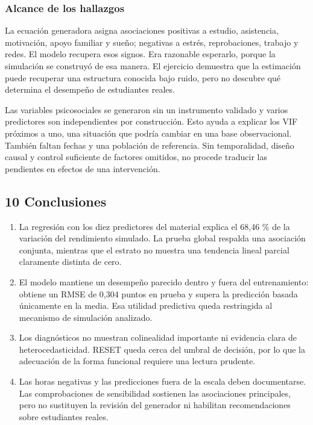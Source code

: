 \documentclass[
  11pt,
  letterpaper,
]{article}
\providecommand{\tightlist}{%
  \setlength{\itemsep}{0pt}\setlength{\parskip}{0pt}}
\begin{document}
\hypertarget{alcance-de-los-hallazgos}{%
\subsubsection{Alcance de los
hallazgos}\label{alcance-de-los-hallazgos}}

La ecuación generadora asigna asociaciones positivas a estudio,
asistencia, motivación, apoyo familiar y sueño; negativas a estrés,
reprobaciones, trabajo y redes. El modelo recupera esos signos. Era
razonable esperarlo, porque la simulación se construyó de esa manera. El
ejercicio demuestra que la estimación puede recuperar una estructura
conocida bajo ruido, pero no descubre qué determina el desempeño de
estudiantes reales.

Las variables psicosociales se generaron sin un instrumento validado y
varios predictores son independientes por construcción. Esto ayuda a
explicar los VIF próximos a uno, una situación que podría cambiar en una
base observacional. También faltan fechas y una población de referencia.
Sin temporalidad, diseño causal y control suficiente de factores
omitidos, no procede traducir las pendientes en efectos de una
intervención.

\hypertarget{conclusiones}{%
\subsection{10 Conclusiones}\label{conclusiones}}

\begin{enumerate}
\def\labelenumi{\arabic{enumi}.}
\tightlist
\item
  La regresión con los diez predictores del material explica el 68,46 \%
  de la variación del rendimiento simulado. La prueba global respalda
  una asociación conjunta, mientras que el estrato no muestra una
  tendencia lineal parcial claramente distinta de cero.
\item
  El modelo mantiene un desempeño parecido dentro y fuera del
  entrenamiento: obtiene un RMSE de 0,304 puntos en prueba y supera la
  predicción basada únicamente en la media. Esa utilidad predictiva
  queda restringida al mecanismo de simulación analizado.
\item
  Los diagnósticos no muestran colinealidad importante ni evidencia
  clara de heterocedasticidad. RESET queda cerca del umbral de decisión,
  por lo que la adecuación de la forma funcional requiere una lectura
  prudente.
\item
  Las horas negativas y las predicciones fuera de la escala deben
  documentarse. Las comprobaciones de sensibilidad sostienen las
  asociaciones principales, pero no sustituyen la revisión del generador
  ni habilitan recomendaciones sobre estudiantes reales.
\end{enumerate}
\end{document}
